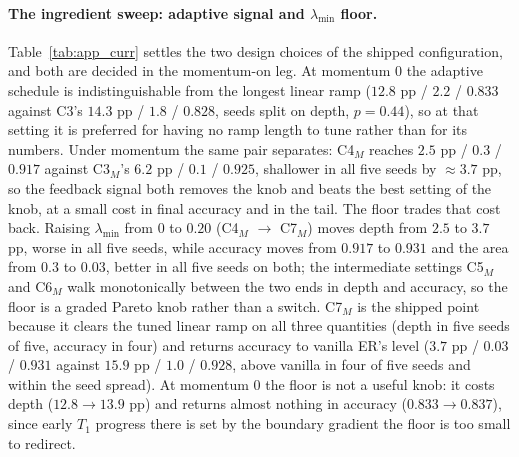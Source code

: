 \paragraph{The ingredient sweep: adaptive signal and $\lambda_{\min}$ floor.} Table~\ref{tab:app_curr} settles the two design choices of the shipped configuration, and both are decided in the momentum-on leg. At momentum $0$ the adaptive schedule is indistinguishable from the longest linear ramp ($12.8$ pp / $2.2$ / $0.833$ against C3's $14.3$ pp / $1.8$ / $0.828$, seeds split on depth, $p = 0.44$), so at that setting it is preferred for having no ramp length to tune rather than for its numbers. Under momentum the same pair separates: C4$_M$ reaches $2.5$ pp / $0.3$ / $0.917$ against C3$_M$'s $6.2$ pp / $0.1$ / $0.925$, shallower in all five seeds by ${\approx}3.7$ pp, so the feedback signal both removes the knob and beats the best setting of the knob, at a small cost in final accuracy and in the tail. The floor trades that cost back. Raising $\lambda_{\min}$ from $0$ to $0.20$ (C4$_M$ $\rightarrow$ C7$_M$) moves depth from $2.5$ to $3.7$ pp, worse in all five seeds, while accuracy moves from $0.917$ to $0.931$ and the area from $0.3$ to $0.03$, better in all five seeds on both; the intermediate settings C5$_M$ and C6$_M$ walk monotonically between the two ends in depth and accuracy, so the floor is a graded Pareto knob rather than a switch. C7$_M$ is the shipped point because it clears the tuned linear ramp on all three quantities (depth in five seeds of five, accuracy in four) and returns accuracy to vanilla ER's level ($3.7$ pp / $0.03$ / $0.931$ against $15.9$ pp / $1.0$ / $0.928$, above vanilla in four of five seeds and within the seed spread). At momentum $0$ the floor is not a useful knob: it costs depth ($12.8 \rightarrow 13.9$ pp) and returns almost nothing in accuracy ($0.833 \rightarrow 0.837$), since early $T_1$ progress there is set by the boundary gradient the floor is too small to redirect.

